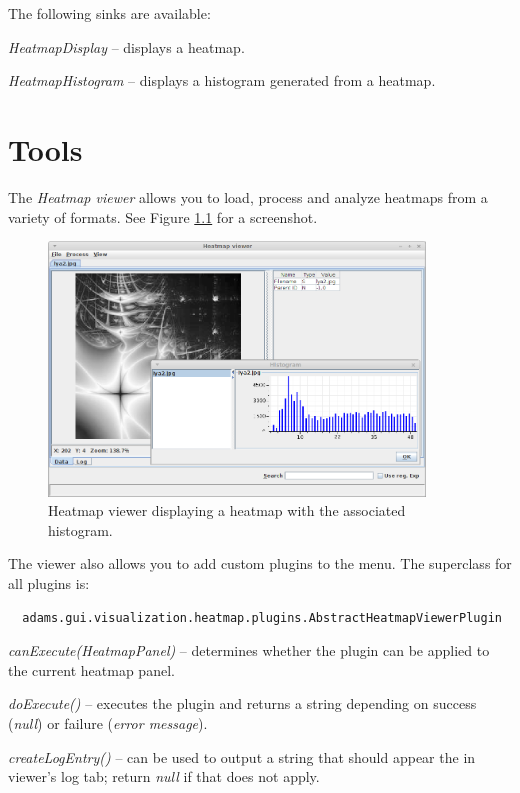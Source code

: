 \documentclass[a4paper]{book}
\begin{document}
The following sinks are available:
\begin{tight_itemize}
  	\item \textit{HeatmapDisplay} -- displays a heatmap.
  	\item \textit{HeatmapHistogram} -- displays a histogram generated from a heatmap.
\end{tight_itemize}

\chapter{Tools}

The \textit{Heatmap viewer} allows you to load, process and analyze heatmaps
from a variety of formats. See Figure \ref{heatmap-viewer} for a screenshot.
\begin{figure}[htb]
  \centering
  \includegraphics[width=10.0cm]{images/heatmap-viewer.png}
  \caption{Heatmap viewer displaying a heatmap with the associated histogram.}
  \label{heatmap-viewer}
\end{figure}

The viewer also allows you to add custom plugins to the menu. The superclass
for all plugins is:
\begin{verbatim}
  adams.gui.visualization.heatmap.plugins.AbstractHeatmapViewerPlugin
\end{verbatim}
\begin{tight_itemize}
  \item \textit{canExecute(HeatmapPanel)} -- determines whether the plugin can
  be applied to the current heatmap panel.
  \item \textit{doExecute()} -- executes the plugin and returns a string
  depending on success (\textit{null}) or failure (\textit{error message}).
  \item \textit{createLogEntry()} -- can be used to output a string that
  should appear the in viewer's log tab; return \textit{null} if that does
  not apply.
\end{tight_itemize}


\end{document}
